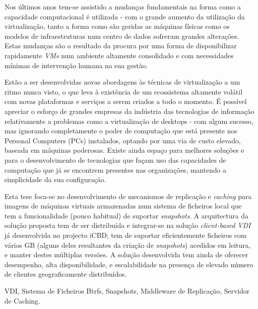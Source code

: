 
Nos últimos anos tem-se assistido a mudanças fundamentais na forma como a capacidade computacional é utilizada - com o grande aumento da utilização da virtualização, tanto a forma como são geridas as máquinas físicas como os modelos de infraestruturas num centro de dados sofreram grandes alterações. Estas mudanças são o resultado da procura por uma forma de disponibilizar rapidamente \textit{VMs} num ambiente altamente consolidado e com necessidades mínimas de intervenção humana na sua gestão.

Estão a ser desenvolvidas novas abordagens às técnicas de virtualização a um ritmo nunca visto, o que leva à existência de um ecossistema altamente volátil com novas plataformas e serviços a serem criados a todo o momento. É possível apreciar o esforço de grandes empresas da indústria das tecnologias de informação relativamente a problemas como a virtualização de desktops - com algum sucesso, mas ignorando completamente o poder de computação que está presente nos Personal Computers (PCs) instalados, optando por uma via de custo elevado, baseada em máquinas poderosas. Existe ainda espaço para melhores soluções e para o desenvolvimento de tecnologias que façam uso das capacidades de computação que já se encontrem presentes nas organizações, mantendo a simplicidade da sua configuração.

Esta tese foca-se no desenvolvimento de mecanismos de replicação e \textit{caching} para imagens de máquinas virtuais armazenadas num sistema de ficheiros local que tem a funcionalidade (pouco habitual) de suportar \textit{snapshots}. A arquitectura da solução proposta tem de ser distribuída e integrar-se na solução \textit{client-based VDI} já desenvolvida no projecto iCBD; tem de suportar eficientemente ficheiros com vários GB (alguns deles resultantes da criação de \textit{snapshots}) acedidos em leitura, e manter destes múltiplas versões. A solução desenvolvida tem ainda de oferecer desempenho, alta disponibilidade, e escalabilidade na presença de elevado número de clientes geograficamente distribuídos.



\begin{keywords}
	VDI, Sistema de Ficheiros Btrfs, Snapshots, Middleware de Replicação, Servidor de Caching.
\end{keywords}
